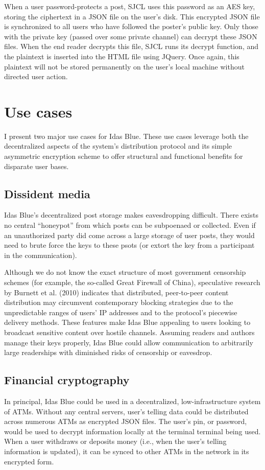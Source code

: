 \documentclass{article}
\begin{document}
When a user password-protects a post, SJCL uses this password as an AES key, storing the ciphertext in a JSON file on the user's disk. This encrypted JSON file is synchronized to all users who have followed the poster's public key. Only those with the private key (passed over some private channel) can decrypt these JSON files. When the end reader decrypts this file, SJCL runs its decrypt function, and the plaintext is inserted into the HTML file using JQuery. Once again, this plaintext will not be stored permanently on the user's local machine without directed user action. 

\section{Use cases}
I present two major use cases for Idas Blue. These use cases leverage both the decentralized aspects of the system's distribution protocol and its simple asymmetric encryption scheme to offer structural and functional benefits for disparate user bases.

\subsection{Dissident media}
Idas Blue's decentralized post storage makes eavesdropping difficult. There exists no central ``honeypot'' from which posts can be subpoenaed or collected. Even if an unauthorized party did come across a large storage of user posts, they would need to brute force the keys to these psots (or extort the key from a participant in the communication). 

Although we do not know the exact structure of most government censorship schemes (for example, the so-called Great Firewall of China), speculative research by Burnett et al. (2010) indicates that distributed, peer-to-peer content distribution may circumvent contemporary blocking strategies due to the unpredictable ranges of users' IP addresses and to the protocol's piecewise delivery methods. \cite{burnett10} These features make Idas Blue appealing to users looking to broadcast sensitive content over hostile channels. Assuming readers and authors manage their keys properly, Idas Blue could allow communication to arbitrarily large readerships with diminished risks of censorship or eavesdrop.


\subsection{Financial cryptography}
In principal, Idas Blue could be used in a decentralized, low-infrastructure system of ATMs. Without any central servers, user's telling data could be distributed across numerous ATMs as encrypted JSON files. The user's pin, or password, would be used to decrypt information locally at the terminal terminal being used. When a user withdraws or deposits money (i.e., when the user's telling information is updated), it can be synced to other ATMs in the network in its encrypted form.
\end{document}
